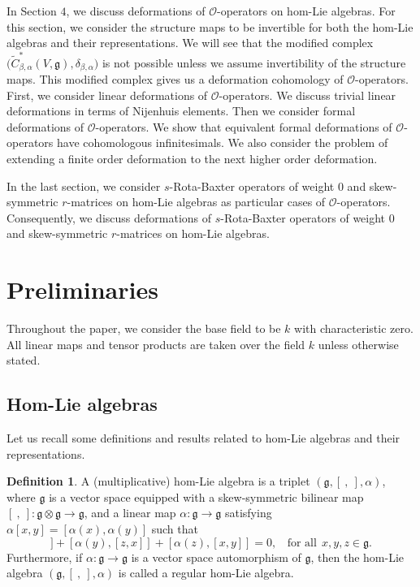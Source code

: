 \documentclass[a4paper,11pt]{amsart}
\theoremstyle{plain}
\theoremstyle{definition}
\newtheorem{definition}[theorem]{Definition}
\theoremstyle{remark}
\numberwithin{equation}{section}
\begin{document}
In Section $4$, we discuss deformations of $\mathcal{O}$-operators on hom-Lie algebras. For this section, we consider the structure maps to be invertible for both the hom-Lie algebras and their representations. We will see that the modified complex $\big(\widetilde{C}^*_{\beta,\alpha}(V,\mathfrak{g}),\delta_{\beta,\alpha}\big)$ is not possible unless we assume invertibility of the structure maps. This modified complex gives us a deformation cohomology of $\mathcal{O}$-operators. First, we consider linear deformations of $\mathcal{O}$-operators. We discuss trivial linear deformations in terms of Nijenhuis elements. Then we consider formal deformations of $\mathcal{O}$-operators. We show that equivalent formal deformations of $\mathcal{O}$-operators have cohomologous infinitesimals. We also consider the problem of extending a finite order deformation to the next higher order deformation. 

In the last section, we consider $s$-Rota-Baxter operators of weight $0$ and skew-symmetric $r$-matrices on hom-Lie algebras as particular cases of $\mathcal{O}$-operators. Consequently, we discuss deformations of $s$-Rota-Baxter operators of weight $0$ and skew-symmetric $r$-matrices on hom-Lie algebras.


\section{\normalfont\large\textbf{{Preliminaries}}}
Throughout the paper, we consider the base field to be $k$ with characteristic zero. All linear maps and tensor products are taken over the field $k$ unless otherwise stated.

\subsection{Hom-Lie algebras}
 Let us recall some definitions and results related to hom-Lie algebras and their representations. 

\begin{definition}
 A (multiplicative) hom-Lie algebra is a triplet $(\mathfrak{g},[~,~],\alpha)$, where $\mathfrak{g}$ is a vector space equipped with a skew-symmetric bilinear map $[~,~]:\mathfrak{g}\otimes \mathfrak{g}\rightarrow \mathfrak{g}$, and a linear map $\alpha:\mathfrak{g}\rightarrow \mathfrak{g}$ satisfying $\alpha[x,y]=[\alpha(x),\alpha(y)]$ such that
\begin{equation}
[\alpha(x),[y,z]]+[\alpha(y),[z,x]]+[\alpha(z),[x,y]]=0, ~~~~\mbox{for all}~~x,y,z\in \mathfrak{g}.
\end{equation}
Furthermore, if $\alpha:\mathfrak{g}\rightarrow \mathfrak{g}$ is a vector space automorphism of $\mathfrak{g}$, then the hom-Lie algebra $(\mathfrak{g},[~,~],\alpha)$ is called a regular hom-Lie algebra.
\end{definition}
\end{document}
